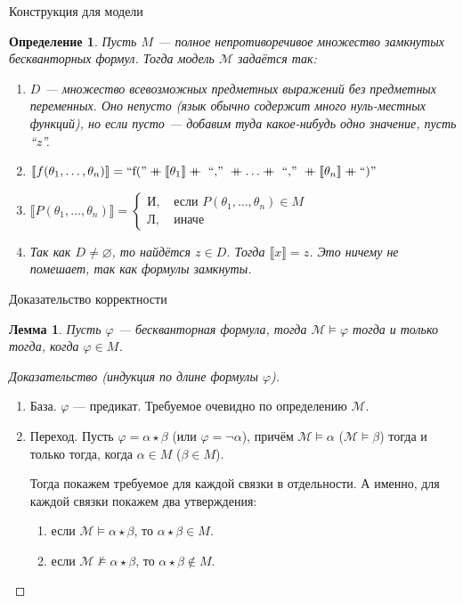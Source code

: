 \documentclass[aspectratio=169]{beamer}
\newtheorem{dfn}{Определение}[section]
\newtheorem{lmm}{Лемма}[section]
\begin{document}
\begin{frame}{Конструкция для модели}
\begin{dfn}
Пусть $M$ --- полное непротиворечивое множество замкнутых бескванторных формул. Тогда
модель $\mathcal{M}$ задаётся так:\pause
\begin{enumerate}
\item $D$ --- множество всевозможных предметных выражений без предметных переменных. Оно непусто (язык обычно содержит много нуль-местных функций), 
но если пусто --- добавим туда какое-нибудь одно значение, пусть ``z''.
\pause
\item $\llbracket f(\theta_1,\dots,\theta_n) \rrbracket = \mbox{``f(''} \mdoubleplus \llbracket\theta_1\rrbracket \mdoubleplus \mbox{ ``,'' }
    \mdoubleplus \dots \mdoubleplus \mbox{ ``,'' } \mdoubleplus \llbracket\theta_n\rrbracket \mdoubleplus \mbox {``)'' } $\pause
\item $\llbracket P(\theta_1,\dots,\theta_n)\rrbracket = \left\{
  \begin{array}{ll} \mbox{И}, &\mbox{ если } P(\theta_1,\dots,\theta_n) \in M\\
                   \mbox{Л}, &\mbox{ иначе}\end{array}\right.$\pause
\item Так как $D \ne \varnothing$, то найдётся $z \in D$. Тогда $\llbracket x \rrbracket = z$. Это ничему не помешает, так как формулы замкнуты.
\end{enumerate}
\end{dfn}
\end{frame}

\begin{frame}{Доказательство корректности}
\begin{lmm}Пусть $\varphi$ --- бескванторная формула, тогда $\mathcal{M}\models\varphi$ тогда и только тогда, когда $\varphi\in M$.
\end{lmm}\pause

\begin{proof}[Доказательство (индукция по длине формулы $\varphi$)]
\begin{enumerate}
\item База. $\varphi$ --- предикат. Требуемое очевидно по определению $\mathcal{M}$.\pause
\item Переход. Пусть $\varphi = \alpha\star\beta$ (или $\varphi=\neg\alpha$), причём $\mathcal{M}\models\alpha$ ($\mathcal{M}\models\beta$)
   тогда и только тогда, когда $\alpha\in M$ ($\beta\in M$).\pause

Тогда покажем требуемое для каждой связки в отдельности. А именно, для каждой связки покажем два утверждения:
\begin{enumerate}
\item если $\mathcal{M}\models\alpha\star\beta$, то $\alpha\star\beta \in M$.

\item если $\mathcal{M}\not\models\alpha\star\beta$, то $\alpha\star\beta \notin M$.
\end{enumerate}
\end{enumerate}
\end{proof}
\end{frame}
\end{document}
